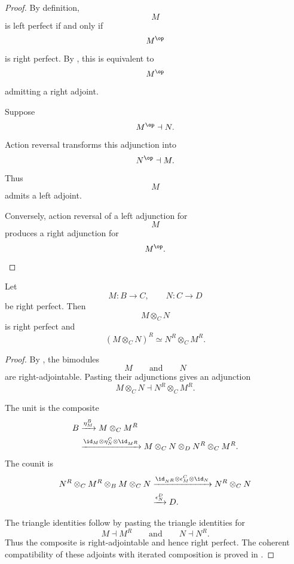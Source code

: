\begin{proof}
By definition,
\[
    M
\]
is left perfect if and only if
\[
    M^{\op}
\]
is right perfect. By
,
this is equivalent to
\[
    M^{\op}
\]
admitting a right adjoint.

Suppose
\[
    M^{\op}\dashv N.
\]
Action reversal transforms this adjunction into
\[
    N^{\op}\dashv M.
\]
Thus
\[
    M
\]
admits a left adjoint.

Conversely, action reversal of a left adjunction for
\[
    M
\]
produces a right adjunction for
\[
    M^{\op}.
\]
\end{proof}

\begin{proposition}
\label{prop:morita-adjoint-composite}
Let
\[
    M
    \colon
    B
    \longrightarrow
    C,
    \qquad
    N
    \colon
    C
    \longrightarrow
    D
\]
be right perfect. Then
\[
    M\otimes_C N
\]
is right perfect and
\[
    (M\otimes_C N)^R
    \simeq
    N^R\otimes_C M^R.
\]
\end{proposition}

\begin{proof}
By
,
the bimodules
\[
    M
    \qquad\text{and}\qquad
    N
\]
are right-adjointable. Pasting their adjunctions gives an adjunction
\[
    M\otimes_C N
    \dashv
    N^R\otimes_C M^R.
\]

The unit is the composite
\[
\begin{aligned}
    B
    &\xrightarrow{\eta_M^{B}}
    M\otimes_C M^R
    \\
    &\xrightarrow{
        \id_M
        \otimes
        \eta_N^{C}
        \otimes
        \id_{M^R}
    }
    M\otimes_C N\otimes_D N^R\otimes_C M^R.
\end{aligned}
\]
The counit is
\[
\begin{aligned}
    N^R\otimes_C M^R
    \otimes_B
    M\otimes_C N
    &\xrightarrow{
        \id_{N^R}
        \otimes
        \epsilon_M^{C}
        \otimes
        \id_N
    }
    N^R\otimes_C N
    \\
    &\xrightarrow{\epsilon_N^{D}}
    D.
\end{aligned}
\]

The triangle identities follow by pasting the triangle identities for
\[
    M\dashv M^R
    \qquad\text{and}\qquad
    N\dashv N^R.
\]
Thus the composite is right-adjointable and hence right perfect.
The coherent compatibility of these adjoints with iterated composition is
proved in
.
\end{proof}

